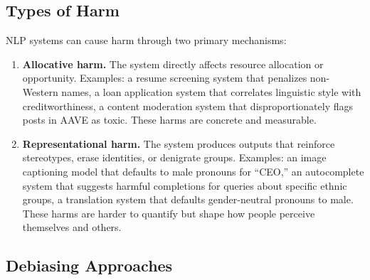 \subsection{Types of Harm}

NLP systems can cause harm through two primary mechanisms:

\begin{enumerate}[label=\textbf{\arabic*.}]
    \item \textbf{Allocative harm.}  The system directly affects resource
    allocation or opportunity.  Examples: a resume screening system that
    penalizes non-Western names, a loan application system that correlates
    linguistic style with creditworthiness, a content moderation system that
    disproportionately flags posts in AAVE as toxic.  These harms are concrete
    and measurable.

    \item \textbf{Representational harm.}  The system produces outputs that
    reinforce stereotypes, erase identities, or denigrate groups.  Examples:
    an image captioning model that defaults to male pronouns for
    ``CEO,'' an autocomplete system that suggests harmful completions for
    queries about specific ethnic groups, a translation system that defaults
    gender-neutral pronouns to male.  These harms are harder to quantify but
    shape how people perceive themselves and others.
\end{enumerate}

\subsection{Debiasing Approaches}


